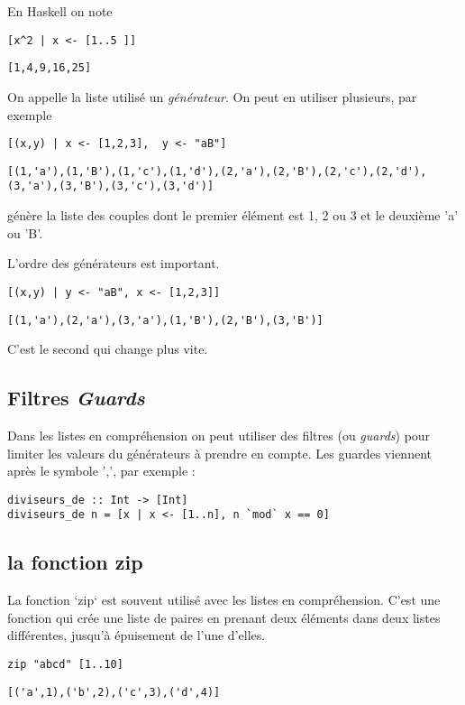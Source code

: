 \documentclass[11pt]{article}
\begin{document}
En Haskell on note
\begin{verbatim}
[x^2 | x <- [1..5 ]]
\end{verbatim}
\begin{verbatim}
[1,4,9,16,25]
\end{verbatim}


On appelle la liste utilisé un \emph{générateur}.  On peut en utiliser plusieurs, par exemple
\begin{verbatim}
[(x,y) | x <- [1,2,3],  y <- "aB"]
\end{verbatim}
\begin{verbatim}
[(1,'a'),(1,'B'),(1,'c'),(1,'d'),(2,'a'),(2,'B'),(2,'c'),(2,'d'),(3,'a'),(3,'B'),(3,'c'),(3,'d')]
\end{verbatim}

génère la liste des couples dont le premier élément est 1, 2 ou 3 et le deuxième 'a' ou 'B'.

L'ordre des générateurs est important.
\begin{verbatim}
[(x,y) | y <- "aB", x <- [1,2,3]]
\end{verbatim}
\begin{verbatim}
[(1,'a'),(2,'a'),(3,'a'),(1,'B'),(2,'B'),(3,'B')]
\end{verbatim}


C'est le second qui change plus vite.

\subsection{Filtres \emph{Guards}}
\label{sec:orga6bfb78}
Dans les listes en  compréhension on peut utiliser des filtres (ou \emph{guards}) pour limiter les valeurs du générateurs à prendre en compte.
Les guardes viennent après le symbole ',', par exemple :

\begin{verbatim}
diviseurs_de :: Int -> [Int]
diviseurs_de n = [x | x <- [1..n], n `mod` x == 0]
\end{verbatim}

\subsection{la fonction zip}
\label{sec:orgb86586a}
La fonction `zip` est souvent utilisé avec les listes en compréhension.  C'est une fonction qui crée une liste de paires en prenant deux  éléments dans deux listes différentes, jusqu'à épuisement de l'une d'elles.

\begin{verbatim}
zip "abcd" [1..10]
\end{verbatim}
\begin{verbatim}
[('a',1),('b',2),('c',3),('d',4)]
\end{verbatim}
\end{document}
